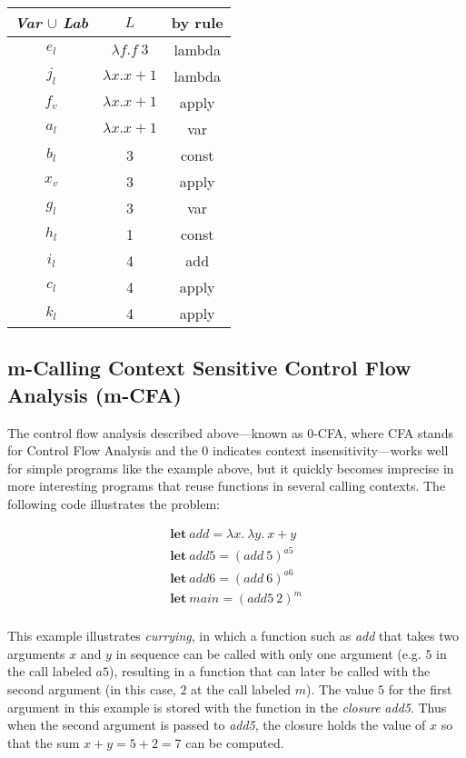 \documentclass[11pt]{article}
\def\tablespace{\vspace{2ex}}
\begin{document}
\tablespace
\begin{tabular}{c | c | c}
\textit{Var} $\cup$ \textit{Lab} & $L$ & by rule \\
\hline
$e_l$ & $\lambda f . f ~ 3$ & lambda \\
$j_l$ & $\lambda x . x + 1$ & lambda \\
$f_v$ & $\lambda x . x + 1$ & apply \\
$a_l$ & $\lambda x . x + 1$ & var \\
$b_l$ & 3 & const \\
$x_v$ & 3 & apply \\
$g_l$ & 3 & var \\
$h_l$ & 1 & const \\
$i_l$ & 4 & add \\
$c_l$ & 4 & apply \\
$k_l$ & 4 & apply \\

\end{tabular}
\tablespace

\subsection{m-Calling Context Sensitive Control Flow Analysis (m-CFA)}

The control flow analysis described above---known as 0-CFA, where CFA stands for Control Flow Analysis and the 0 indicates context insensitivity---works well for simple programs like the example above, but it quickly becomes imprecise in more interesting programs that reuse functions in several calling contexts.  The following code illustrates the problem:

\[
\begin{array}{l}
\textbf{let}~ \textit{add} = \lambda x .~ \lambda y .~ x + y\\
\textbf{let}~ \textit{add5} = (add~ 5)^{a5}\\
\textbf{let}~ \textit{add6} = (add~ 6)^{a6}\\
\textbf{let}~ \textit{main} = (add5~ 2)^{m}\\
\end{array}
\]

This example illustrates \textit{currying}, in which a function such as \textit{add} that takes two arguments $x$ and $y$ in sequence can be called with only one argument (e.g. $5$ in the call labeled $a5$), resulting in a function that can later be called with the second argument (in this case, $2$ at the call labeled $m$).  The value $5$ for the first argument in this example is stored with the function in the \textit{closure} \textit{add5}.  Thus when the second argument is passed to \textit{add5}, the closure holds the value of $x$ so that the sum $x+y = 5 + 2 = 7$ can be computed.
\end{document}
